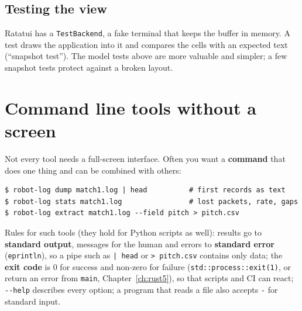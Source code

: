 \subsection*{Testing the view}
Ratatui has a \verb!TestBackend!, a fake terminal that keeps the buffer in memory. A test draws the application into it and compares the cells with an expected text (``snapshot test''). The model tests above are more valuable and simpler; a few snapshot tests protect against a broken layout.

\section*{Command line tools without a screen}
Not every tool needs a full-screen interface. Often you want a \textbf{command} that does one thing and can be combined with others:
\begin{verbatim}
$ robot-log dump match1.log | head          # first records as text
$ robot-log stats match1.log                # lost packets, rate, gaps
$ robot-log extract match1.log --field pitch > pitch.csv
\end{verbatim}
Rules for such tools (they hold for Python scripts as well): results go to \textbf{standard output}, messages for the human and errors to \textbf{standard error} (\verb!eprintln!), so a pipe such as \verb!| head! or \verb!> pitch.csv! contains only data; the \textbf{exit code} is $0$ for success and non-zero for failure (\verb!std::process::exit(1)!, or return an error from \verb!main!, Chapter~\ref{ch:rust5}), so that scripts and CI can react; \verb!--help! describes every option; a program that reads a file also accepts \verb!-! for standard input.

